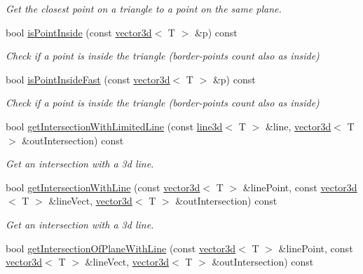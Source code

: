 \begin{DoxyCompactItemize}
\begin{DoxyCompactList}\small\item\em Get the closest point on a triangle to a point on the same plane. \end{DoxyCompactList}\item 
\mbox{\label{classirr_1_1core_1_1triangle3d_abd425100f688516bdd701135cc980f18}} 
bool \hyperlink{classirr_1_1core_1_1triangle3d_abd425100f688516bdd701135cc980f18}{is\+Point\+Inside} (const \hyperlink{classirr_1_1core_1_1vector3d}{vector3d}$<$ T $>$ \&p) const
\begin{DoxyCompactList}\small\item\em Check if a point is inside the triangle (border-\/points count also as inside) \end{DoxyCompactList}\item 
bool \hyperlink{classirr_1_1core_1_1triangle3d_a87d93ff616faf4b99b59f8d2ecd9c0de}{is\+Point\+Inside\+Fast} (const \hyperlink{classirr_1_1core_1_1vector3d}{vector3d}$<$ T $>$ \&p) const
\begin{DoxyCompactList}\small\item\em Check if a point is inside the triangle (border-\/points count also as inside) \end{DoxyCompactList}\item 
bool \hyperlink{classirr_1_1core_1_1triangle3d_a3274d1e1ee1d28050176736c5e6773c2}{get\+Intersection\+With\+Limited\+Line} (const \hyperlink{classirr_1_1core_1_1line3d}{line3d}$<$ T $>$ \&line, \hyperlink{classirr_1_1core_1_1vector3d}{vector3d}$<$ T $>$ \&out\+Intersection) const
\begin{DoxyCompactList}\small\item\em Get an intersection with a 3d line. \end{DoxyCompactList}\item 
bool \hyperlink{classirr_1_1core_1_1triangle3d_a70e0d27d17f9f0d14117df912cdaafe1}{get\+Intersection\+With\+Line} (const \hyperlink{classirr_1_1core_1_1vector3d}{vector3d}$<$ T $>$ \&line\+Point, const \hyperlink{classirr_1_1core_1_1vector3d}{vector3d}$<$ T $>$ \&line\+Vect, \hyperlink{classirr_1_1core_1_1vector3d}{vector3d}$<$ T $>$ \&out\+Intersection) const
\begin{DoxyCompactList}\small\item\em Get an intersection with a 3d line. \end{DoxyCompactList}\item 
bool \hyperlink{classirr_1_1core_1_1triangle3d_a860339e3646bf2f7cbb7e88be1cf0783}{get\+Intersection\+Of\+Plane\+With\+Line} (const \hyperlink{classirr_1_1core_1_1vector3d}{vector3d}$<$ T $>$ \&line\+Point, const \hyperlink{classirr_1_1core_1_1vector3d}{vector3d}$<$ T $>$ \&line\+Vect, \hyperlink{classirr_1_1core_1_1vector3d}{vector3d}$<$ T $>$ \&out\+Intersection) const

\end{DoxyCompactItemize}
